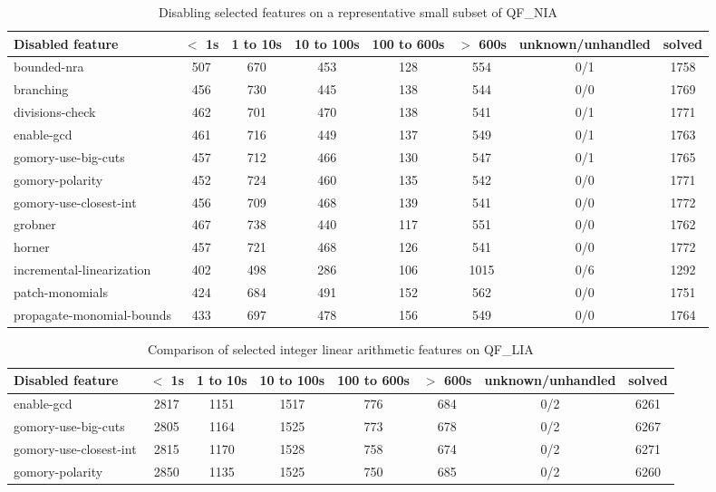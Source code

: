 {\begin{table}
  \begin{tabular}{|l|c|c|c|c|c|c|c|}
    \hline
    Disabled feature & $<$ 1s & 1 to 10s & 10 to 100s & 100 to 600s & $>$ 600s & unknown/unhandled & solved \\
    \hline
    bounded-nra & 507 & 670 & 453 & 128 & 554 & 0/1 & 1758 \\
    \hline
    branching & 456 & 730 & 445 & 138 & 544 & 0/0 & 1769 \\
    \hline
    divisions-check & 462 & 701 & 470 & 138 & 541 & 0/1 & 1771 \\
    \hline
    enable-gcd & 461 & 716 & 449 & 137 & 549 & 0/1 & 1763 \\
    \hline
    gomory-use-big-cuts & 457 & 712 & 466 & 130 & 547 & 0/1 & 1765 \\
    \hline
    gomory-polarity & 452 & 724 & 460 & 135 & 542 & 0/0 & 1771 \\
    \hline
    gomory-use-closest-int & 456 & 709 & 468 & 139 & 541 & 0/0 & 1772 \\
    \hline
    grobner & 467 & 738 & 440 & 117 & 551 & 0/0 & 1762 \\
    \hline
    horner & 457 & 721 & 468 & 126 & 541 & 0/0 & 1772 \\
    \hline
    incremental-linearization & 402 & 498 & 286 & 106 & 1015 & 0/6 & 1292 \\
    \hline
    patch-monomials & 424 & 684 & 491 & 152 & 562 & 0/0 & 1751 \\
    \hline
    propagate-monomial-bounds & 433 & 697 & 478 & 156 & 549 & 0/0 & 1764 \\
    \hline
    \end{tabular}
  \caption{Disabling selected features on a representative small subset of QF\_NIA \label{tab:qf-nia-small}}
\end{table}


\begin{table}
  \begin{tabular}{|l|c|c|c|c|c|c|c|}
    \hline
    Disabled feature & $<$ 1s & 1 to 10s & 10 to 100s & 100 to 600s & $>$ 600s & unknown/unhandled & solved \\
    \hline
    enable-gcd & 2817 & 1151 & 1517 & 776 & 684 & 0/2 & 6261 \\
    \hline
    gomory-use-big-cuts & 2805 & 1164 & 1525 & 773 & 678 & 0/2 & 6267 \\
    \hline
    gomory-use-closest-int & 2815 & 1170 & 1528 & 758 & 674 & 0/2 & 6271 \\
    \hline
    gomory-polarity & 2850 & 1135 & 1525 & 750 & 685 & 0/2 & 6260 \\
    \hline
    \end{tabular}
  \caption{Comparison of selected integer linear arithmetic features on QF\_LIA \label{tab:qf-lia}}
\end{table}

}
